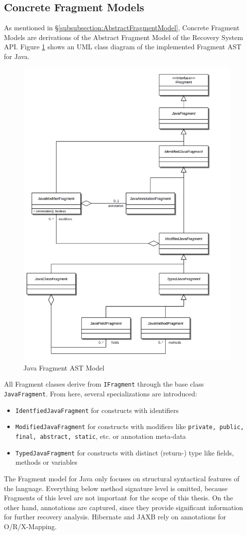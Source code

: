 \subsection{Concrete Fragment Models}
\label{subsection:ConcreteFragmentModels}
As mentioned in §\ref{subsubsection:AbstractFragmentModel}, Concrete \Gls{Fragment} Models are derivations of the Abstract Fragment Model of the Recovery System \gls{API}.
Figure \ref{figure:JavaFragmentASTModel} shows an \gls{UML} class diagram of the implemented \Gls{Fragment} \gls{AST} for \gls{Java}.
\begin{figure}[h!]
\begin{center}
\includegraphics[width=.7\textwidth]{images/JavaFragmentModel.png}
\end{center}
\caption{Java Fragment AST Model}
\label{figure:JavaFragmentASTModel}
\end{figure}
All \gls{Fragment} classes derive from \texttt{IFragment} through the base class \texttt{JavaFragment}.
From here, several specializations are introduced:
\begin{itemize}
\item
\texttt{IdentfiedJavaFragment} for constructs with identifiers
\item
\texttt{ModifiedJavaFragment} for constructs with modifiers like \texttt{private, public, final, abstract, static}, etc. or annotation meta-data
\item
\texttt{TypedJavaFragment} for constructs with distinct (return-) type like fields, methods or variables
\end{itemize}
The \gls{Fragment} model for \gls{Java} only focuses on structural syntactical features of the language.
Everything below method signature level is omitted, because \glspl{Fragment} of this level are not important for the scope of this thesis.
On the other hand, annotations are captured, since they provide significant information for further recovery analysis.
\gls{Hibernate} and \gls{JAXB} rely on annotations for \gls{O/R/X-Mapping}.

